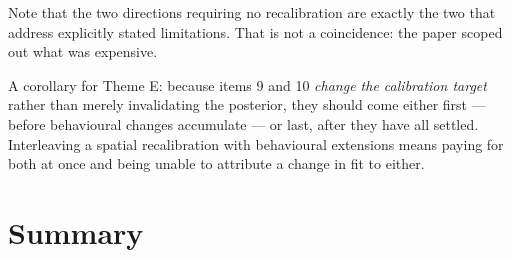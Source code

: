 \documentclass[11pt]{article}
\begin{document}
Note that the two directions requiring no recalibration are exactly the two
that address explicitly stated limitations. That is not a coincidence: the
paper scoped out what was expensive.

A corollary for Theme E: because items 9 and 10 \emph{change the calibration
target} rather than merely invalidating the posterior, they should come
either first --- before behavioural changes accumulate --- or last, after
they have all settled. Interleaving a spatial recalibration with behavioural
extensions means paying for both at once and being unable to attribute a
change in fit to either.

\section{Summary}
\label{sec:table}
\end{document}
